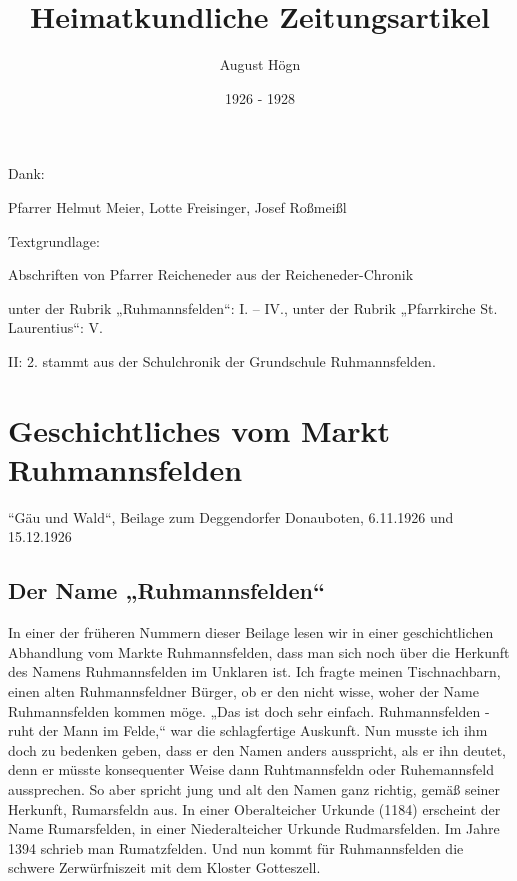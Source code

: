 \documentclass[12pt,a4paper]{book}
\author{August Högn}
\title{Heimatkundliche Zeitungsartikel}
\date{1926 - 1928}
\begin{document}
\maketitle

\begin{ersteseite}
Dank:

\bigskip

Pfarrer Helmut Meier, Lotte Freisinger, Josef Roßmeißl

\bigskip

Textgrundlage:

\bigskip

Abschriften von Pfarrer Reicheneder aus der Reicheneder-Chronik

\bigskip

unter der Rubrik „Ruhmannsfelden“: I. – IV., unter der Rubrik „Pfarrkirche St.
Laurentius“: V.

\bigskip

II: 2. stammt aus der Schulchronik der Grundschule Ruhmannsfelden.
\end{ersteseite}

\tableofcontents

\newpage

\chapter{Geschichtliches vom Markt Ruhmannsfelden}

“Gäu und Wald“, Beilage zum Deggendorfer Donauboten, 6.11.1926 und 15.12.1926

\section{Der Name „Ruhmannsfelden“}

In einer der früheren Nummern dieser Beilage lesen wir in einer geschichtlichen
Abhandlung vom Markte Ruhmannsfelden, dass man sich noch über die Herkunft des
Namens Ruhmannsfelden im Unklaren ist. Ich fragte meinen Tischnachbarn, einen
alten Ruhmannsfeldner Bürger, ob er den nicht wisse, woher der Name
Ruhmannsfelden kommen möge. „Das ist doch sehr einfach. Ruhmannsfelden - ruht
der Mann im Felde,“ war die schlagfertige Auskunft. Nun musste ich ihm doch zu
bedenken geben, dass er den Namen anders ausspricht, als er ihn deutet, denn er
müsste konsequenter Weise dann Ruhtmannsfeldn oder Ruhemannsfeld aussprechen. So
aber spricht jung und alt den Namen ganz richtig, gemäß seiner Herkunft,
Rumarsfeldn aus. In einer Oberalteicher Urkunde (1184) erscheint der Name
Rumarsfelden, in einer Niederalteicher Urkunde Rudmarsfelden. Im Jahre 1394
schrieb man Rumatzfelden. Und nun kommt für Ruhmannsfelden die schwere
Zerwürfniszeit mit dem Kloster Gotteszell.
\end{document}
